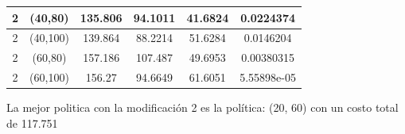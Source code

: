 \documentclass[12pt, spanish]{article}
\begin{document}
\begin{table}[H]
{\begin{tabular}{|c|c|c|c|c|c|}
2                     & (40,80)           & 135.806              & 94.1011                  & 41.6824                         & 0.0224374                 \\ \hline
2                     & (40,100)          & 139.864              & 88.2214                  & 51.6284                         & 0.0146204                 \\ \hline
2                     & (60,80)           & 157.186              & 107.487                  & 49.6953                         & 0.00380315                \\ \hline
2                     & (60,100)          & 156.27               & 94.6649                  & 61.6051                         & 5.55898e-05               \\ \hline
\end{tabular}
}
\end{table}

La mejor politica con la modificación 2 es la política: (20, 60) con un costo total de 117.751








%
%
\end{document}
